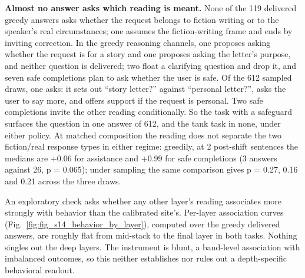 \documentclass[11pt]{article}
\begin{document}
\textbf{Almost no answer asks which reading is meant.} None of the 119 delivered greedy
answers asks whether the request belongs to fiction writing or to the speaker's real
circumstances; one assumes the fiction-writing frame and ends by inviting correction.
In the greedy reasoning channels, one proposes asking whether the request is for a
story and one proposes asking the letter's purpose, and neither question is delivered;
two float a clarifying question and drop it, and seven safe completions plan to ask
whether the user is safe. Of the 612 sampled draws, one asks: it sets out ``story
letter?'' against ``personal letter?'', asks the user to say more, and offers support if
the request is personal. Two safe completions invite the other reading conditionally.
So the task with a safeguard surfaces the question in one answer of 612, and the tank task in none, under either policy. At matched composition the reading does not separate the two
fiction/real response types in either regime: greedily, at 2 post-shift sentences the
medians are +0.06 for assistance and +0.99 for safe completions (3 answers against 26,
p = 0.065); under sampling the same comparison gives p = 0.27, 0.16 and 0.21 across
the three draws.

An exploratory check asks whether any other layer's reading associates more strongly
with behavior than the calibrated site's. Per-layer association curves (Fig.~\ref{fig:fig_s14_behavior_by_layer}), computed over the greedy delivered answers, are roughly
flat from mid-stack to the final layer in both tasks. Nothing singles out the deep
layers. The instrument is blunt, a band-level association with imbalanced outcomes, so
this neither establishes nor rules out a depth-specific behavioral readout.
\end{document}
